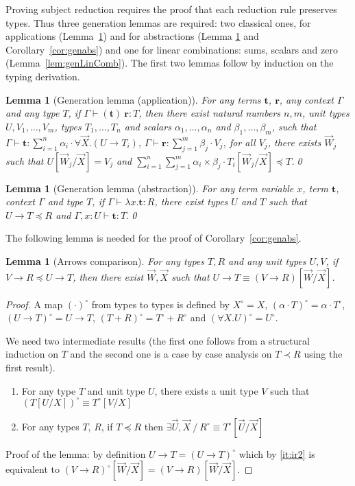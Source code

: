 \documentclass[colorlinks=true,linkcolor=black,urlcolor=black,citecolor=blue,submission,copyright,creativecommons]{eptcs}
\newtheorem{lemma}[theorem]{Lemma}
\newcommand{\ve}[1]{\mathrm{\textbf{#1}}}
\newcommand{\type}{\colon\!}
\newcommand{\sui}[1]{\sum_{i=1}^{#1}}
\newcommand{\suj}[1]{\sum_{j=1}^{#1}}
\begin{document}
\noindent Proving subject reduction requires the proof that each reduction rule
preserves types. Thus three generation lemmas are required: two
classical ones, for applications (Lemma~\ref{lem:genapp}) and for
abstractions (Lemma \ref{lem:genabs} and
Corollary~\ref{cor:genabs}) and one for linear combinations: sums,
scalars and zero (Lemma~\ref{lem:genLinComb}). The first two lemmas follow by induction on the typing derivation.

\begin{lemma}[Generation lemma (application)]\label{lem:genapp} For
  any terms $\ve t$, $\ve r$, any context $\Gamma$ and any type $T$,
  if $\Gamma\vdash(\ve{t})~\ve{r}\type T$, then there exist natural
  numbers $n,m$, unit types $U, V_1,\dots,V_m$, types $T_1,\dots,T_n$
  and scalars $\alpha_1,\dots,\alpha_n$ and  $\beta_1,\dots,\beta_m$,
  such that $\Gamma\vdash\ve{t}\type\sui{n}\alpha_i\cdot \forall
  \vec{X}.(U\rightarrow T_i)$, $\Gamma\vdash\ve{r}\type\suj{m}
  \beta_j\cdot V_j$, for all $V_j$, there exists $\vec{W}_j$ such that
  $U[\vec{W}_j/\vec{X}]=V_j$ and $\sui{n}\suj{m}
  \alpha_i\times\beta_j\cdot T_i[\vec{W}_j/\vec{X}]\preceq T$.\qed
\end{lemma}

\begin{lemma}[Generation lemma (abstraction)]\label{lem:genabs} For any term variable $x$, term $\ve t$, context $\Gamma$ and type $T$, if $\Gamma\vdash\lambda{x}.\ve{t}\type R$, there exist types $U$ and $T$ such that $U\to T\preceq R$ and $\Gamma,x\type U\vdash\ve{t}\type T$.\qed
\end{lemma}

The following lemma is needed for the proof of Corollary~\ref{cor:genabs}.

\begin{lemma}[Arrows comparison]\label{lem:arrowcomp}
 For any types $T, R$ and any unit types $U,V$, if $V\to R\preceq U\to T$, then there exist $\vec{W},\vec{X}$ such that $U\to T\equiv (V\to R)[\vec{W}/\vec{X}]$.
\end{lemma}
\begin{proof}
 A map $(\cdot)^\circ$ from types to types is defined by
$X^\circ = X$, $(\alpha\cdot  T)^\circ = \alpha\cdot  T^\circ$, $(U\to T)^\circ = U\to T$, $(T+R)^\circ = T^\circ+R^\circ$ and $(\forall X.U)^\circ = U^\circ$.

We need two intermediate results (the first one follows from a structural induction on $T$ and the second one is a case by case analysis on $T\prec R$ using the first result).
\begin{enumerate}
 \item\label{it:ir1} For any type $T$ and unit type $U$, there exists a unit type $V$ such that $(T[U/X])^\circ\equiv T^\circ[V/X]$
 \item\label{it:ir2} For any types $T$, $R$, if $T\preceq R$ then $\exists\vec{U},\vec{X}\ /\ R^\circ\equiv T^\circ[\vec{U}/\vec{X}]$
\end{enumerate}
Proof of the lemma: by definition $U\to T=(U\to T)^\circ$ which by \ref{it:ir2} is equivalent to $(V\to R)^\circ[\vec{W}/\vec{X}]=(V\to R)[\vec{W}/\vec{X}]$.
\end{proof}
\end{document}
